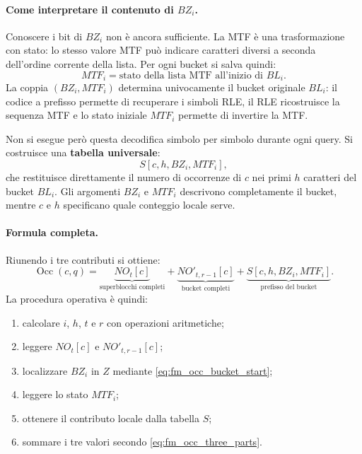 \documentclass{article}
\theoremstyle{definition}
\numberwithin{equation}{section}
\begin{document}
\paragraph{Come interpretare il contenuto di \(BZ_i\).}
Conoscere i bit di $BZ_i$ non è ancora sufficiente. La MTF è una trasformazione con stato: lo stesso valore MTF può indicare caratteri diversi a seconda dell'ordine corrente della lista. Per ogni bucket si salva quindi:
\[
    MTF_i
    =
    \text{stato della lista MTF all'inizio di }BL_i.
\]
La coppia $(BZ_i,MTF_i)$ determina univocamente il bucket originale $BL_i$: il codice a prefisso permette di recuperare i simboli RLE, il RLE ricostruisce la sequenza MTF e lo stato iniziale $MTF_i$ permette di invertire la MTF.

Non si esegue però questa decodifica simbolo per simbolo durante ogni query. Si costruisce una \textbf{tabella universale}:
\[
    S[c,h,BZ_i,MTF_i],
\]
che restituisce direttamente il numero di occorrenze di $c$ nei primi $h$ caratteri del bucket $BL_i$. Gli argomenti $BZ_i$ e $MTF_i$ descrivono completamente il bucket, mentre $c$ e $h$ specificano quale conteggio locale serve.

\paragraph{Formula completa.}
Riunendo i tre contributi si ottiene:
\begin{equation}\label{eq:fm_occ_three_parts}
    \operatorname{Occ}(c,q)
    =
    \underbrace{NO_t[c]}_{\text{superblocchi completi}}
    +
    \underbrace{NO'_{t,r-1}[c]}_{\text{bucket completi}}
    +
    \underbrace{S[c,h,BZ_i,MTF_i]}_{\text{prefisso del bucket}}.
\end{equation}
La procedura operativa è quindi:
\begin{enumerate}
    \item calcolare $i$, $h$, $t$ e $r$ con operazioni aritmetiche;
    \item leggere $NO_t[c]$ e $NO'_{t,r-1}[c]$;
    \item localizzare $BZ_i$ in $Z$ mediante \eqref{eq:fm_occ_bucket_start};
    \item leggere lo stato $MTF_i$;
    \item ottenere il contributo locale dalla tabella $S$;
    \item sommare i tre valori secondo \eqref{eq:fm_occ_three_parts}.
\end{enumerate}
\end{document}
